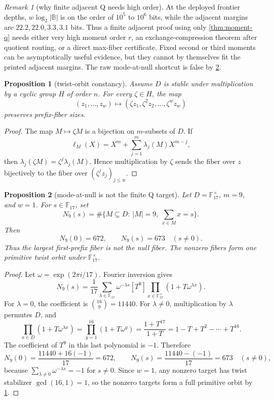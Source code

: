 \documentclass[a4paper,11pt]{amsart}
\newtheorem{proposition}[proposition]{Proposition}
\theoremstyle{remark}
\newtheorem{remark}[remark]{Remark}
\newcommand{\F}{\mathbb F}
\newcommand{\B}{\mathbb B}
\begin{document}
\begin{remark}[why finite adjacent Q needs high order]\label{rem:finite-moment-order}
At the deployed frontier depths, \(w\log_2|\B|\) is on the order of \(10^5\) to \(10^6\) bits, while the adjacent margins are \(22.2,22.0,3.3,3.1\) bits.  Thus a finite adjacent proof using only \cref{thm:moment-q} needs either very high moment order \(r\), an exchange-compression theorem after quotient routing, or a direct max-fiber certificate.  Fixed second or third moments can be asymptotically useful evidence, but they cannot by themselves fit the printed adjacent margins.  The raw mode-at-null shortcut is false by \cref{prop:mode-null-false}.
\end{remark}

\begin{proposition}[twist-orbit constancy]\label{prop:twist-orbit}
Assume \(D\) is stable under multiplication by a cyclic group \(H\) of order \(n\).  For every \(\zeta\in H\), the map
\[
        (z_1,\ldots,z_w)\longmapsto(\zeta z_1,\zeta^2z_2,\ldots,\zeta^wz_w)
\]
preserves prefix-fiber sizes.
\end{proposition}

\begin{proof}
The map \(M\mapsto \zeta M\) is a bijection on \(m\)-subsets of \(D\).  If
\[
        \ell_M(X)=X^m+\sum_{j=1}^m \lambda_j(M)X^{m-j},
\]
then \(\lambda_j(\zeta M)=\zeta^j\lambda_j(M)\).  Hence multiplication by \(\zeta\) sends the fiber over \(z\) bijectively to the fiber over \((\zeta^j z_j)_{j\le w}\).
\end{proof}

\begin{proposition}[mode-at-null is not the finite Q target]\label{prop:mode-null-false}
Let \(D=\F_{17}^{\times}\), \(m=9\), and \(w=1\).  For \(s\in\F_{17}\), set
\[
        N_9(s)=\#\{M\subseteq D:\ |M|=9,\ \sum_{x\in M}x=s\}.
\]
Then
\[
        N_9(0)=672,
        \qquad
        N_9(s)=673\quad(s\ne0).
\]
Thus the largest first-prefix fiber is not the null fiber.  The nonzero fibers form one primitive twist orbit under \(\F_{17}^{\times}\).
\end{proposition}

\begin{proof}
Let \(\omega=\exp(2\pi i/17)\).  Fourier inversion gives
\[
        N_9(s)=\frac{1}{17}\sum_{\lambda\in\F_{17}}\omega^{-\lambda s}
        [T^9]\prod_{x\in\F_{17}^{\times}}(1+T\omega^{\lambda x}).
\]
For \(\lambda=0\), the coefficient is \(\binom{16}{9}=11440\).  For \(\lambda\ne0\), multiplication by \(\lambda\) permutes \(D\), and
\[
        \prod_{x\in D}(1+T\omega^{\lambda x})
        =
        \prod_{y=1}^{16}(1+T\omega^y)
        =\frac{1+T^{17}}{1+T}
        =1-T+T^2-\cdots+T^{16}.
\]
The coefficient of \(T^9\) in this last polynomial is \(-1\).  Therefore
\[
        N_9(0)=\frac{11440+16(-1)}{17}=672,
        \qquad
        N_9(s)=\frac{11440-(-1)}{17}=673
        \quad(s\ne0),
\]
because \(\sum_{\lambda\ne0}\omega^{-\lambda s}=-1\) for \(s\ne0\).  Since \(w=1\), any nonzero target has twist stabilizer \(\gcd(16,1)=1\), so the nonzero targets form a full primitive orbit by \cref{prop:twist-orbit}.
\end{proof}
\end{document}
